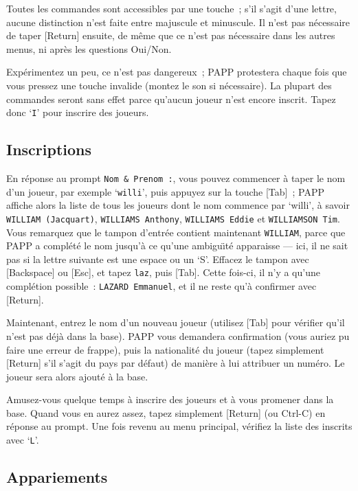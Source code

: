 \documentclass[10pt]{article}
\begin{document}
	Toutes les commandes sont accessibles par une touche~; s'il
s'agit d'une lettre, aucune distinction n'est faite entre majuscule et
minuscule.  Il n'est pas n\'ecessaire de taper [Return] ensuite, de
m\^eme que ce n'est pas n\'ecessaire dans les autres menus, ni apr\`es
les questions Oui/Non.

	Exp\'erimentez un peu, ce n'est pas dangereux~; PAPP protestera
chaque fois que vous pressez une touche invalide (montez le son si
n\'ecessaire).  La plupart des commandes seront sans effet parce
qu'aucun joueur n'est encore inscrit.  Tapez donc `\verb|I|' pour
inscrire des joueurs.

\subsection{Inscriptions}

En r\'eponse au prompt \verb|Nom & Prenom :|, vous pouvez commencer \`a taper le nom d'un joueur, par exemple `\verb|willi|', puis appuyez sur la touche [Tab]~; PAPP affiche alors la liste de tous les 
joueurs dont le nom commence par `willi', \`a savoir \verb|WILLIAM (Jacquart)|, \verb|WILLIAMS Anthony|, \verb|WILLIAMS Eddie| et \verb|WILLIAMSON Tim|.  Vous remarquez que le tampon d'entr\'ee 
contient maintenant \verb|WILLIAM|, parce que PAPP a compl\'et\'e le nom 
jusqu'\`a ce qu'une ambigu{\"\i}t\'e apparaisse --- ici, il ne sait 
pas si la lettre suivante est une espace ou un `S'.  Effacez le tampon 
avec [Backspace] ou [Esc], et tapez \verb|laz|, puis [Tab].  Cette 
fois-ci, il n'y a qu'une compl\'etion possible~: \verb|LAZARD Emmanuel|,
 et il ne reste qu'\`a confirmer avec [Return].

Maintenant, entrez le nom d'un nouveau joueur (utilisez [Tab] pour 
v\'eri\-fier qu'il n'est pas d\'ej\`a dans la base).  PAPP vous 
demandera confirmation (vous auriez pu faire une erreur de frappe), 
puis la nationalit\'e du joueur (tapez simplement [Return] s'il s'agit 
du pays par d\'efaut) de mani\`ere \`a lui attribuer un num\'ero.  Le joueur sera alors 
ajout\'e \`a la base.

Amusez-vous quelque temps \`a inscrire des joueurs et \`a vous 
promener dans la base.  Quand vous en aurez assez, tapez simplement 
[Return] (ou Ctrl-C) en r\'eponse au prompt.  Une fois revenu au menu 
principal, v\'erifiez la liste des inscrits avec `\verb|L|'.

\subsection{Appariements}
\end{document}
